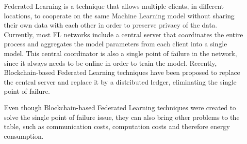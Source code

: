 Federated Learning is a technique that allows multiple clients, in different locations, to cooperate on the same Machine Learning model without sharing their own data with each other in order to preserve privacy of the data. Currently, most FL networks include a central server that coordinates the entire process and aggregates the model parameters from each client into a single model. This central coordinator is also a single point of failure in the network, since it always needs to be online in order to train the model. Recently, Blockchain-based Federated Learning techniques have been proposed to replace the central server and replace it by a distributed ledger, eliminating the single point of failure.

Even though Blockchain-based Federated Learning techniques were created to solve the single point of failure issue, they can also bring other problems to the table, such as communication costs, computation costs and therefore energy consumption. 






